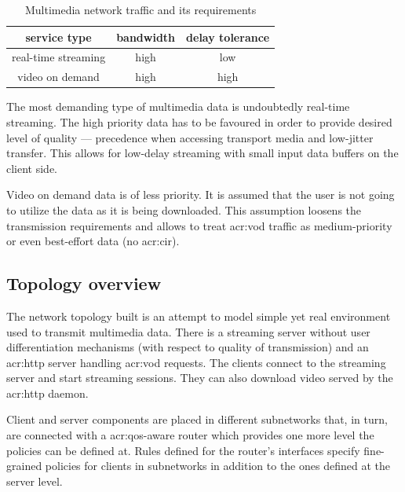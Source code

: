 \documentclass[11pt,openany]{book}
\begin{document}
        \begin{table}[H]
          \begin{center}
            \begin{tabular}{|c|c|c|}
              \hline
              service type        & bandwidth & delay tolerance \\
              \hline \hline
              real-time streaming & high      & low \\
              \hline
              video on demand     & high      & high  \\
              \hline
            \end{tabular}
          \end{center}


          \caption{Multimedia network traffic and its requirements}
          \label{tab:uc:qos}
        \end{table}

        The most demanding type of multimedia data is undoubtedly real-time streaming. The high priority data has to be
        favoured in order to provide desired level of quality --- precedence when accessing transport media and
        low-jitter transfer. This allows for low-delay streaming with small input data buffers on the client side.

        Video on demand data is of less priority. It is assumed that the user is not going to utilize the data as it is
        being downloaded. This assumption loosens the transmission requirements and allows to treat \gls{acr:vod}
        traffic as medium-priority or even best-effort data (no \gls{acr:cir}).


      \subsection{Topology overview}

        The network topology built is an attempt to model simple yet real environment used to transmit multimedia data.
        There is a streaming server without user differentiation mechanisms (with respect to quality of transmission)
        and an \gls{acr:http} server handling \gls{acr:vod} requests. The clients connect to the streaming server and
        start streaming sessions. They can also download video served by the \gls{acr:http} daemon.

        Client and server components are placed in different subnetworks that, in turn, are connected with a
        \gls{acr:qos}-aware router which provides one more level the policies can be defined at. Rules defined for the
        router's interfaces specify fine-grained policies for clients in subnetworks in addition to the ones defined at
        the server level.
\end{document}
